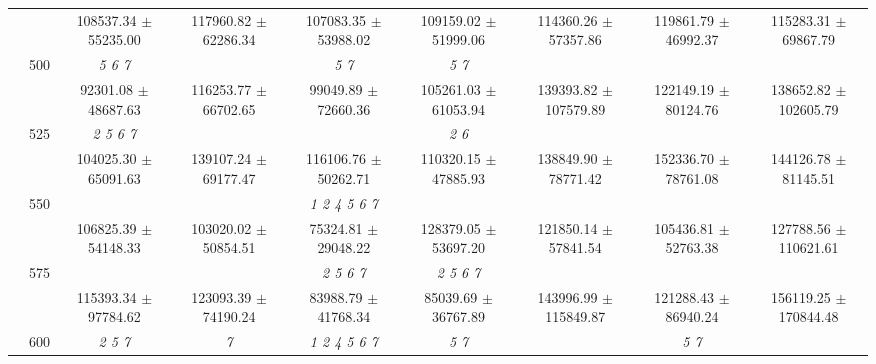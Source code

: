 \begin{table}[h]
{\begin{tabular}{
        ccccccccc}
 & & \cellcolor[HTML]{EFEFEF} 108537.34 $\pm$ 55235.00& \cellcolor[HTML]{EFEFEF} 117960.82 $\pm$ 62286.34& \cellcolor[HTML]{EFEFEF} 107083.35 $\pm$ 53988.02& \cellcolor[HTML]{EFEFEF} 109159.02 $\pm$ 51999.06& \cellcolor[HTML]{EFEFEF} 114360.26 $\pm$ 57357.86& \cellcolor[HTML]{EFEFEF} 119861.79 $\pm$ 46992.37& \cellcolor[HTML]{EFEFEF} 115283.31 $\pm$ 69867.79 \\ 
 & \multirow{2}{*}{500}& \textit{ 5 6 7 }& & \textit{ 5 7 }& \textit{ 5 7 }& & &  \\ 
 & & 92301.08 $\pm$ 48687.63& 116253.77 $\pm$ 66702.65& 99049.89 $\pm$ 72660.36& 105261.03 $\pm$ 61053.94& 139393.82 $\pm$ 107579.89& 122149.19 $\pm$ 80124.76& 138652.82 $\pm$ 102605.79 \\ 
 & \multirow{2}{*}{525}& \cellcolor[HTML]{EFEFEF} \textit{ 2 5 6 7 }& \cellcolor[HTML]{EFEFEF} & \cellcolor[HTML]{EFEFEF} & \cellcolor[HTML]{EFEFEF} \textit{ 2 6 }& \cellcolor[HTML]{EFEFEF} & \cellcolor[HTML]{EFEFEF} & \cellcolor[HTML]{EFEFEF}  \\ 
 & & \cellcolor[HTML]{EFEFEF} 104025.30 $\pm$ 65091.63& \cellcolor[HTML]{EFEFEF} 139107.24 $\pm$ 69177.47& \cellcolor[HTML]{EFEFEF} 116106.76 $\pm$ 50262.71& \cellcolor[HTML]{EFEFEF} 110320.15 $\pm$ 47885.93& \cellcolor[HTML]{EFEFEF} 138849.90 $\pm$ 78771.42& \cellcolor[HTML]{EFEFEF} 152336.70 $\pm$ 78761.08& \cellcolor[HTML]{EFEFEF} 144126.78 $\pm$ 81145.51 \\ 
 & \multirow{2}{*}{550}& & & \textit{ 1 2 4 5 6 7 }& & & &  \\ 
 & & 106825.39 $\pm$ 54148.33& 103020.02 $\pm$ 50854.51& 75324.81 $\pm$ 29048.22& 128379.05 $\pm$ 53697.20& 121850.14 $\pm$ 57841.54& 105436.81 $\pm$ 52763.38& 127788.56 $\pm$ 110621.61 \\ 
 & \multirow{2}{*}{575}& \cellcolor[HTML]{EFEFEF} & \cellcolor[HTML]{EFEFEF} & \cellcolor[HTML]{EFEFEF} \textit{ 2 5 6 7 }& \cellcolor[HTML]{EFEFEF} \textit{ 2 5 6 7 }& \cellcolor[HTML]{EFEFEF} & \cellcolor[HTML]{EFEFEF} & \cellcolor[HTML]{EFEFEF}  \\ 
 & & \cellcolor[HTML]{EFEFEF} 115393.34 $\pm$ 97784.62& \cellcolor[HTML]{EFEFEF} 123093.39 $\pm$ 74190.24& \cellcolor[HTML]{EFEFEF} 83988.79 $\pm$ 41768.34& \cellcolor[HTML]{EFEFEF} 85039.69 $\pm$ 36767.89& \cellcolor[HTML]{EFEFEF} 143996.99 $\pm$ 115849.87& \cellcolor[HTML]{EFEFEF} 121288.43 $\pm$ 86940.24& \cellcolor[HTML]{EFEFEF} 156119.25 $\pm$ 170844.48 \\ 
 & \multirow{2}{*}{600}& \textit{ 2 5 7 }& \textit{ 7 }& \textit{ 1 2 4 5 6 7 }& \textit{ 5 7 }& & \textit{ 5 7 }&  \\ 

\end{tabular}}
\end{table}
